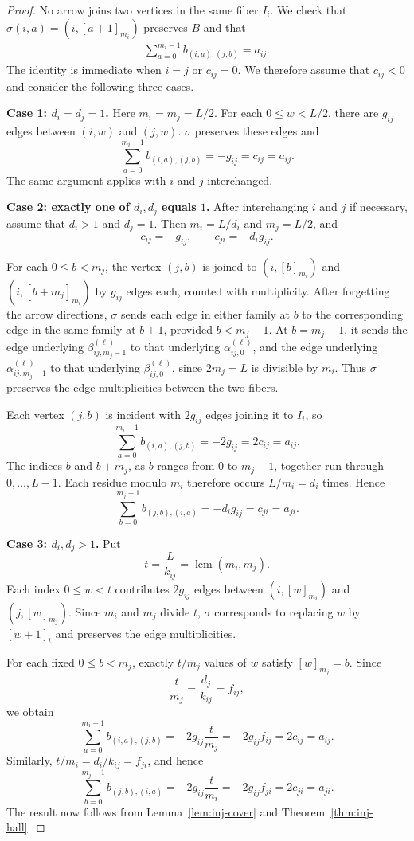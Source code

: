 \documentclass[12pt,reqno]{amsart}
\numberwithin{equation}{section}
\theoremstyle{definition}
\theoremstyle{remark}
\newcommand{\lcm}{\operatorname{lcm}}
\theoremstyle{plain}
\theoremstyle{plain}
\begin{document}
\begin{proof}
    No arrow joins two vertices in the same fiber $I_i$. We check that $\sigma(i,a)=(i,[a+1]_{m_i})$ preserves $B$ and that
    \begin{align}
        \sum_{a=0}^{m_i-1}b_{(i,a),(j,b)}=a_{ij}.
    \end{align}
The identity is immediate when $i=j$ or $c_{ij}=0$. We therefore assume that $c_{ij}<0$ and consider the following three cases.
\par\smallskip
\noindent\textbf{Case 1: $d_i=d_j=1$.}
Here $m_i=m_j=L/2$. 
For each $0\le w<L/2$, there are $g_{ij}$ edges between $(i,w)$ and $(j,w)$. $\sigma$ preserves these edges and
\[
    \sum_{a=0}^{m_i-1}b_{(i,a),(j,b)}
    =-g_{ij}=c_{ij}=a_{ij}.
\]
The same argument applies with $i$ and $j$ interchanged.

\par\smallskip
\noindent\textbf{Case 2: exactly one of $d_i,d_j$ equals $1$.} After interchanging $i$ and $j$ if necessary, assume that $d_i>1$ and $d_j=1$. Then $m_i=L/d_i$ and $m_j=L/2$, and
\[
    c_{ij}=-g_{ij},
    \qquad
    c_{ji}=-d_i g_{ij}.
\]

For each $0\le b<m_j$, the vertex $(j,b)$ is joined to $(i,[b]_{m_i})$ and $(i,[b+m_j]_{m_i})$ by $g_{ij}$ edges each, counted with multiplicity. After forgetting the arrow directions, $\sigma$ sends each edge in either family at $b$ to the corresponding edge in the same family at $b+1$, provided $b<m_j-1$. At $b=m_j-1$, it sends the edge underlying $\beta^{(\ell)}_{ij,m_j-1}$ to that underlying $\alpha^{(\ell)}_{ij,0}$, and the edge underlying $\alpha^{(\ell)}_{ij,m_j-1}$ to that underlying $\beta^{(\ell)}_{ij,0}$, since $2m_j=L$ is divisible by $m_i$. Thus $\sigma$ preserves the edge multiplicities between the two fibers.

Each vertex $(j,b)$ is incident with $2g_{ij}$ edges joining it to $I_i$, so
\[
    \sum_{a=0}^{m_i-1}b_{(i,a),(j,b)}
    =-2g_{ij}
    =2c_{ij}
    =a_{ij}.
\]
The indices $b$ and $b+m_j$, as $b$ ranges from $0$ to $m_j-1$, together run through $0,\ldots,L-1$. Each residue modulo $m_i$ therefore occurs $L/m_i=d_i$ times. Hence
\[
    \sum_{b=0}^{m_j-1}b_{(j,b),(i,a)}
    =-d_i g_{ij}
    =c_{ji}
    =a_{ji}.
\]

\par\smallskip
\noindent\textbf{Case 3: $d_i,d_j>1$.}
Put
\[
    t=\frac{L}{k_{ij}}
      =\lcm(m_i,m_j).
\]
Each index $0\le w<t$ contributes $2g_{ij}$ edges between
$(i,[w]_{m_i})$ and $(j,[w]_{m_j})$. Since $m_i$ and $m_j$ divide $t$, $\sigma$ corresponds to replacing $w$ by $[w+1]_t$ and preserves the edge multiplicities.

For each fixed $0\le b<m_j$, exactly $t/m_j$ values of $w$ satisfy $[w]_{m_j}=b$. Since
\[
    \frac{t}{m_j}
    =\frac{d_j}{k_{ij}}
    =f_{ij},
\]
we obtain
\[
    \sum_{a=0}^{m_i-1}b_{(i,a),(j,b)}
    =-2g_{ij}\frac{t}{m_j}
    =-2g_{ij}f_{ij}
    =2c_{ij}
    =a_{ij}.
\]
Similarly, $t/m_i=d_i/k_{ij}=f_{ji}$, and hence
\[
    \sum_{b=0}^{m_j-1}b_{(j,b),(i,a)}
    =-2g_{ij}\frac{t}{m_i}
    =-2g_{ij}f_{ji}
    =2c_{ji}
    =a_{ji}.
\]
The result now follows from Lemma~\ref{lem:inj-cover} and Theorem~\ref{thm:inj-hall}.
\end{proof}
\end{document}
